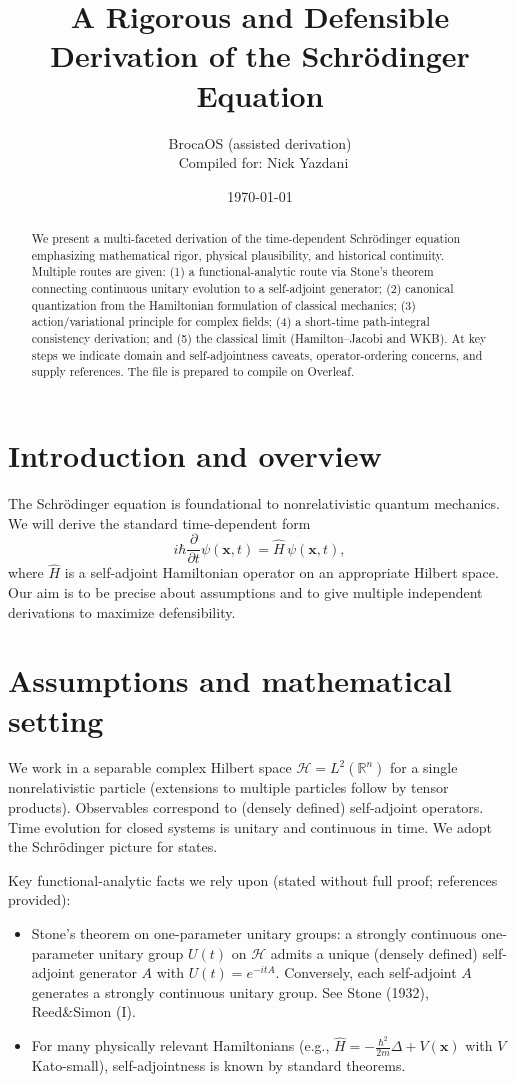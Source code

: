 \documentclass[11pt]{article}
\title{A Rigorous and Defensible Derivation of the Schr\"odinger Equation}
\author{BrocaOS (assisted derivation)\\ \ Compiled for: Nick Yazdani}
\date{\today}
\begin{document}
\maketitle
\begin{abstract}
We present a multi-faceted derivation of the time-dependent Schr\"odinger equation emphasizing mathematical rigor, physical plausibility, and historical continuity.  Multiple routes are given: (1) a functional-analytic route via Stone's theorem connecting continuous unitary evolution to a self-adjoint generator; (2) canonical quantization from the Hamiltonian formulation of classical mechanics; (3) action/variational principle for complex fields; (4) a short-time path-integral consistency derivation; and (5) the classical limit (Hamilton--Jacobi and WKB).  At key steps we indicate domain and self-adjointness caveats, operator-ordering concerns, and supply references.  The file is prepared to compile on Overleaf.
\end{abstract}

\tableofcontents
\section{Introduction and overview}
The Schr\"odinger equation is foundational to nonrelativistic quantum mechanics.  We will derive the standard time-dependent form
\begin{equation}\label{eq:schrodinger}
 i\hbar\frac{\partial}{\partial t}\psi(\mathbf{x},t)=\hat H\,\psi(\mathbf{x},t),
\end{equation}
where $\hat H$ is a self-adjoint Hamiltonian operator on an appropriate Hilbert space.  Our aim is to be precise about assumptions and to give multiple independent derivations to maximize defensibility.

\section{Assumptions and mathematical setting}
We work in a separable complex Hilbert space $\mathcal{H}=L^2(\mathbb{R}^n)$ for a single nonrelativistic particle (extensions to multiple particles follow by tensor products).  Observables correspond to (densely defined) self-adjoint operators.  Time evolution for closed systems is unitary and continuous in time.  We adopt the Schr\"odinger picture for states.

Key functional-analytic facts we rely upon (stated without full proof; references provided):
\begin{itemize}
\item Stone's theorem on one-parameter unitary groups: a strongly continuous one-parameter unitary group $U(t)$ on $\mathcal{H}$ admits a unique (densely defined) self-adjoint generator $A$ with $U(t)=e^{-i t A}$.  Conversely, each self-adjoint $A$ generates a strongly continuous unitary group.  See Stone (1932), Reed\&Simon (I).
\item For many physically relevant Hamiltonians (e.g., $\hat H=-\tfrac{\hbar^2}{2m}\Delta+V(\mathbf{x})$ with $V$ Kato-small), self-adjointness is known by standard theorems.
\end{itemize}
\end{document}
